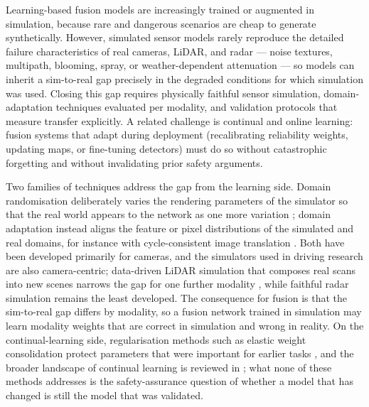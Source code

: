 
Learning-based fusion models are increasingly trained or augmented in simulation, because rare and dangerous scenarios are cheap to generate synthetically. However, simulated sensor models rarely reproduce the detailed failure characteristics of real cameras, LiDAR, and radar --- noise textures, multipath, blooming, spray, or weather-dependent attenuation --- so models can inherit a sim-to-real gap precisely in the degraded conditions for which simulation was used. Closing this gap requires physically faithful sensor simulation, domain-adaptation techniques evaluated per modality, and validation protocols that measure transfer explicitly. A related challenge is continual and online learning: fusion systems that adapt during deployment (recalibrating reliability weights, updating maps, or fine-tuning detectors) must do so without catastrophic forgetting and without invalidating prior safety arguments.

Two families of techniques address the gap from the learning side. Domain randomisation deliberately varies the rendering parameters of the simulator so that the real world appears to the network as one more variation \cite{tobin2017_domain_randomization}; domain adaptation instead aligns the feature or pixel distributions of the simulated and real domains, for instance with cycle-consistent image translation \cite{hoffman2018_cycada}. Both have been developed primarily for cameras, and the simulators used in driving research \cite{dosovitskiy_carla_2017,shah_airsim_2017} are also camera-centric; data-driven LiDAR simulation that composes real scans into new scenes narrows the gap for one further modality \cite{manivasagam2020_lidarsim}, while faithful radar simulation remains the least developed. The consequence for fusion is that the sim-to-real gap differs by modality, so a fusion network trained in simulation may learn modality weights that are correct in simulation and wrong in reality. On the continual-learning side, regularisation methods such as elastic weight consolidation protect parameters that were important for earlier tasks \cite{kirkpatrick2017_ewc}, and the broader landscape of continual learning is reviewed in \cite{parisi2019_continual}; what none of these methods addresses is the safety-assurance question of whether a model that has changed is still the model that was validated.


